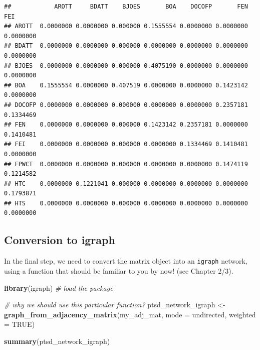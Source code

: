 \documentclass[
]{book}
\newenvironment{Shaded}{\begin{snugshade}}{\end{snugshade}}
\newcommand{\AttributeTok}[1]{\textcolor[rgb]{0.13,0.29,0.53}{#1}}
\newcommand{\CommentTok}[1]{\textcolor[rgb]{0.56,0.35,0.01}{\textit{#1}}}
\newcommand{\ConstantTok}[1]{\textcolor[rgb]{0.56,0.35,0.01}{#1}}
\newcommand{\DecValTok}[1]{\textcolor[rgb]{0.00,0.00,0.81}{#1}}
\newcommand{\FunctionTok}[1]{\textcolor[rgb]{0.13,0.29,0.53}{\textbf{#1}}}
\newcommand{\NormalTok}[1]{#1}
\newcommand{\OtherTok}[1]{\textcolor[rgb]{0.56,0.35,0.01}{#1}}
\newcommand{\SpecialCharTok}[1]{\textcolor[rgb]{0.81,0.36,0.00}{\textbf{#1}}}
\newcommand{\StringTok}[1]{\textcolor[rgb]{0.31,0.60,0.02}{#1}}
\begin{document}
\begin{Shaded}
\end{Shaded}

\begin{verbatim}
##            AROTT     BDATT    BJOES       BOA    DOCOFP       FEN       FEI
## AROTT  0.0000000 0.0000000 0.000000 0.1555554 0.0000000 0.0000000 0.0000000
## BDATT  0.0000000 0.0000000 0.000000 0.0000000 0.0000000 0.0000000 0.0000000
## BJOES  0.0000000 0.0000000 0.000000 0.4075190 0.0000000 0.0000000 0.0000000
## BOA    0.1555554 0.0000000 0.407519 0.0000000 0.0000000 0.1423142 0.0000000
## DOCOFP 0.0000000 0.0000000 0.000000 0.0000000 0.0000000 0.2357181 0.1334469
## FEN    0.0000000 0.0000000 0.000000 0.1423142 0.2357181 0.0000000 0.1410481
## FEI    0.0000000 0.0000000 0.000000 0.0000000 0.1334469 0.1410481 0.0000000
## FPWCT  0.0000000 0.0000000 0.000000 0.0000000 0.0000000 0.1474119 0.1214582
## HTC    0.0000000 0.1221041 0.000000 0.0000000 0.0000000 0.0000000 0.1793871
## HTS    0.0000000 0.0000000 0.000000 0.0000000 0.0000000 0.0000000 0.0000000
\end{verbatim}

\subsection{Conversion to igraph}\label{conversion-to-igraph}

In the final step, we need to convert the matrix object into an \texttt{igraph} network, using a function that should be familiar to you by now! (see Chapter 2/3).

\begin{Shaded}
\begin{Highlighting}[]
\FunctionTok{library}\NormalTok{(igraph) }\CommentTok{\# load the package}

\CommentTok{\# why we should use this particular function? }
\NormalTok{ptsd\_network\_igraph }\OtherTok{\textless{}{-}} \FunctionTok{graph\_from\_adjacency\_matrix}\NormalTok{(my\_adj\_mat, }
                                                   \AttributeTok{mode =} \StringTok{\textquotesingle{}undirected\textquotesingle{}}\NormalTok{, }
                                                   \AttributeTok{weighted =} \ConstantTok{TRUE}\NormalTok{)}

\FunctionTok{summary}\NormalTok{(ptsd\_network\_igraph)}
\end{Highlighting}
\end{Shaded}
\end{document}
